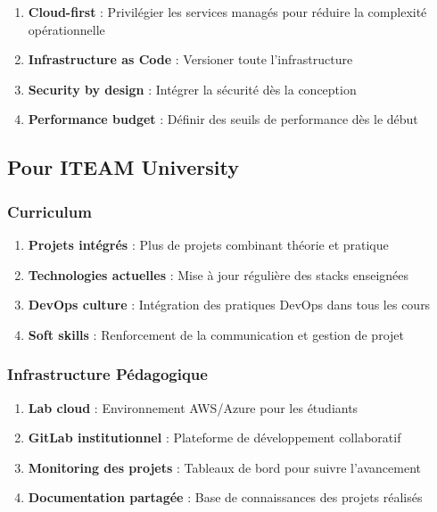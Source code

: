 \begin{enumerate}
    \item \textbf{Cloud-first} : Privilégier les services managés pour réduire la complexité opérationnelle
    \item \textbf{Infrastructure as Code} : Versioner toute l'infrastructure
    \item \textbf{Security by design} : Intégrer la sécurité dès la conception
    \item \textbf{Performance budget} : Définir des seuils de performance dès le début
\end{enumerate}

\subsection{Pour ITEAM University}

\subsubsection{Curriculum}

\begin{enumerate}
    \item \textbf{Projets intégrés} : Plus de projets combinant théorie et pratique
    \item \textbf{Technologies actuelles} : Mise à jour régulière des stacks enseignées
    \item \textbf{DevOps culture} : Intégration des pratiques DevOps dans tous les cours
    \item \textbf{Soft skills} : Renforcement de la communication et gestion de projet
\end{enumerate}

\subsubsection{Infrastructure Pédagogique}

\begin{enumerate}
    \item \textbf{Lab cloud} : Environnement AWS/Azure pour les étudiants
    \item \textbf{GitLab institutionnel} : Plateforme de développement collaboratif
    \item \textbf{Monitoring des projets} : Tableaux de bord pour suivre l'avancement
    \item \textbf{Documentation partagée} : Base de connaissances des projets réalisés
\end{enumerate}

